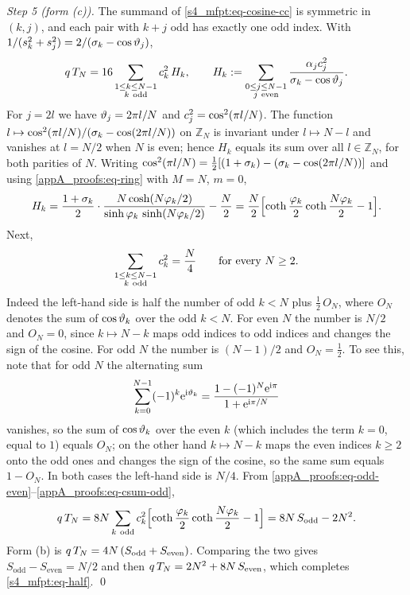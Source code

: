 \emph{Step 5 (form (c)).} The summand of \eqref{s4_mfpt:eq-cosine-cc} is symmetric in $(k,j)$, and each pair with
$k+j$ odd has exactly one odd index. With $1/(s_{k}^{2}+s_{j}^{2})=2/(\sigma_{k}-\cos\vartheta_{j})$,
\begin{equation}\label{appA_proofs:eq-odd-even}
  q\,\TN=16\sum_{\substack{1\le k\le N-1\\ k\ \mathrm{odd}}}\ck{k}^{2}\,H_k,\qquad
  H_k:=\sum_{\substack{0\le j\le N-1\\ j\ \mathrm{even}}}\frac{\alk{j}\ck{j}^{2}}{\sigk{k}-\cos\angk{j}} .
\end{equation}
For $j=2l$ we have $\vartheta_{j}=2\pi l/N$ and $c_{j}^{2}=\cos^{2}(\pi l/N)$. The function
$l\mapsto\cos^{2}(\pi l/N)/(\sigma_{k}-\cos(2\pi l/N))$ on $\mathbb Z_N$ is invariant under $l\mapsto N-l$ and
vanishes at $l=N/2$ when $N$ is even; hence $H_k$ equals its sum over all $l\in\mathbb Z_N$, for both parities of
$N$. Writing $\cos^{2}(\pi l/N)=\tfrac12[(1+\sigma_{k})-(\sigma_{k}-\cos(2\pi l/N))]$ and using
\eqref{appA_proofs:eq-ring} with $M=N$, $m=0$,
\begin{equation}\label{appA_proofs:eq-Hk}
  H_k=\frac{1+\sigma_{k}}{2}\cdot\frac{N\cosh(N\varphi_{k}/2)}{\sinh\varphi_{k}\,\sinh(N\varphi_{k}/2)}-\frac N2
     =\frac N2\Bigl[\coth\frac{\varphi_{k}}{2}\coth\frac{N\varphi_{k}}{2}-1\Bigr].
\end{equation}
Next,
\begin{equation}\label{appA_proofs:eq-csum-odd}
  \sum_{\substack{1\le k\le N-1\\ k\ \mathrm{odd}}}c_{k}^{2}=\frac N4\qquad\text{for every }N\ge2 .
\end{equation}
Indeed the left-hand side is half the number of odd $k<N$ plus $\tfrac12\,O_N$, where $O_N$ denotes the sum of
$\cos\vartheta_{k}$ over the odd $k<N$. For even $N$ the number is $N/2$ and $O_N=0$, since $k\mapsto N-k$ maps odd
indices to odd indices and changes the sign of the cosine. For odd $N$ the number is $(N-1)/2$ and
$O_N=\tfrac12$. To see this, note that for odd $N$ the alternating sum
\[
  \sum_{k=0}^{N-1}(-1)^{k}\mathrm{e}^{\mathrm{i}\vartheta_{k}}=\frac{1-(-1)^{N}\mathrm{e}^{\mathrm{i}\pi}}{1+\mathrm{e}^{\mathrm{i}\pi/N}}
\]
vanishes, so the sum of $\cos\vartheta_{k}$ over the even $k$ (which includes the term $k=0$, equal to $1$) equals
$O_N$; on the other hand $k\mapsto N-k$ maps the even indices $k\ge2$ onto the odd ones and changes the sign of
the cosine, so the same sum equals $1-O_N$. In both cases the left-hand side is $N/4$. From
\eqref{appA_proofs:eq-odd-even}--\eqref{appA_proofs:eq-csum-odd},
\[
  q\,\TN=8N\sum_{k\ \mathrm{odd}}\ck{k}^{2}\Bigl[\coth\frac{\phk{k}}{2}\coth\frac{N\phk{k}}{2}-1\Bigr]=8N\,S_{\mathrm{odd}}-2N^{2}.
\]
Form (b) is $q\,T_{N}=4N\,(S_{\mathrm{odd}}+S_{\mathrm{even}})$. Comparing the two gives
$S_{\mathrm{odd}}-S_{\mathrm{even}}=N/2$ and then $q\,T_{N}=2N^{2}+8N\,S_{\mathrm{even}}$, which completes
\eqref{s4_mfpt:eq-half}. \qed

